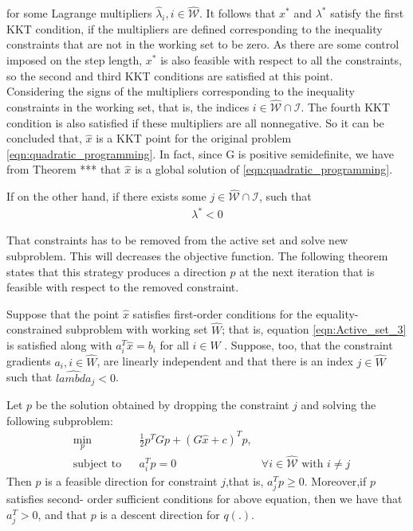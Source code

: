 for some Lagrange multipliers $\hat{\lambda}_i,i \in \hat{\mathcal{W}}$.  It follows that $x^*$ and $\lambda^*$ satisfy the first KKT condition, if the multipliers are defined corresponding to the inequality constraints that are not in the working set to be zero. As there are some control imposed on the step length, $x^*$ is also feasible with respect to all the constraints, so the second and third KKT conditions are satisfied at this point.\\

Considering the signs of the multipliers corresponding to the inequality constraints in the working set, that is, the indices $i\in \hat{\mathcal{W}} \cap \mathcal{I}$. The fourth KKT condition is also satisfied if these multipliers are all nonnegative. So it can be concluded that, $\hat{x}$ is a KKT point for the original problem \ref{eqn:quadratic_programming}. In fact, since G is positive semidefinite, we have from Theorem *** that $\hat{x}$ is a global solution of \ref{eqn:quadratic_programming}.

If on the other hand, if there exists some $j \in \hat{\mathcal{W}}\cap \mathcal{I}$, such that
\begin{equation*}
	\begin{aligned}
		\lambda^* < 0
	\end{aligned}
\end{equation*}

That constraints has to be removed from the active set and solve new subproblem. This will decreases the objective function. The following theorem states that this strategy produces a direction $p$ at the next iteration  that is feasible with respect to the removed constraint.

\begin{theorem}
	Suppose that the point $\hat{x}$ satisfies first-order conditions for the equality-constrained subproblem with working set $\hat{W}$; that is, equation \ref{eqn:Active_set_3} is satisfied along with $a_i^T\hat{x}=b_i$ for all $i\in \hat{W}$ . Suppose, too, that the constraint gradients $a_i,i\in \hat{W}$, are linearly independent and that there is an index $j\in \hat{W}$ such that $\hat{lambda}_j<0$. 
	
	Let $p$ be the solution obtained by dropping the constraint $j$ and solving the following subproblem:
	\begin{equation}
	\begin{aligned}
		& \underset{p}{\text{min}} & & \frac{1}{2}p^{T}Gp+(G\hat{x}+c)^{T}p, \\
& \text{subject to} & &  a_{i}^{T}p = 0 & \forall i\in \hat{\mathcal{W}} \text{ with } i\neq j
	\end{aligned}
\end{equation}
Then $p$ is a feasible direction for constraint $j$,that is, $a_j^Tp \geqslant 0$. Moreover,if $p$ satisfies second- order sufficient conditions for above equation, then we have that $a_j^T > 0$, and that $p$ is a descent direction for $q(.)$.
\end{theorem}

